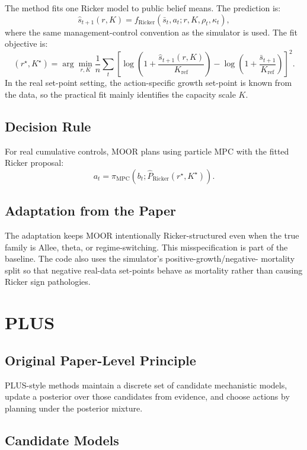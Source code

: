 \documentclass[11pt]{article}
\newcommand{\1}{\mathbf{1}}
\begin{document}
The method fits one Ricker model to public belief means.  The prediction is:
\[
  \hat{s}_{t+1}(r,K)
  =
  f_{\mathrm{Ricker}}(\bar{s}_t,a_t;r,K,\rho_t,\kappa_t),
\]
where the same management-control convention as the simulator is used.  The fit
objective is:
\[
  (r^\star,K^\star)
  =
  \arg\min_{r,K}
  \frac{1}{n}\sum_t
  \left[
    \log\left(1+\frac{\hat{s}_{t+1}(r,K)}{K_{\mathrm{ref}}}\right)
    -
    \log\left(1+\frac{\bar{s}_{t+1}}{K_{\mathrm{ref}}}\right)
  \right]^2.
\]
In the real set-point setting, the action-specific growth set-point is known
from the data, so the practical fit mainly identifies the capacity scale $K$.

\subsection{Decision Rule}

For real cumulative controls, MOOR plans using particle MPC with the fitted
Ricker proposal:
\[
  a_t=\pi_{\mathrm{MPC}}(b_t;\hat{P}_{\mathrm{Ricker}}(r^\star,K^\star)).
\]

\subsection{Adaptation from the Paper}

The adaptation keeps MOOR intentionally Ricker-structured even when the true
family is Allee, theta, or regime-switching.  This misspecification is part of
the baseline.  The code also uses the simulator's positive-growth/negative-
mortality split so that negative real-data set-points behave as mortality rather
than causing Ricker sign pathologies.

\section{PLUS}

\subsection{Original Paper-Level Principle}

PLUS-style methods maintain a discrete set of candidate mechanistic models,
update a posterior over those candidates from evidence, and choose actions by
planning under the posterior mixture.

\subsection{Candidate Models}
\end{document}

